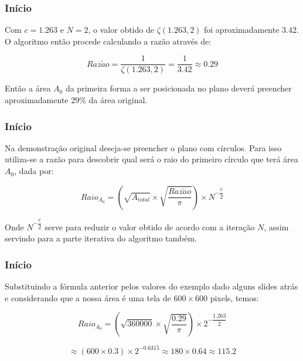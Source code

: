 \documentclass[aspectratio=169]{beamer}
\begin{document}
\begin{frame}
\frametitle{Início}

Com $c=1.263$ e $N=2$, o valor obtido de $\zeta(1.263,2)$ foi aproximadamente $3.42$. O algoritmo então procede calculando a razão através de: 
\medskip

\begin{equation}
Raz\tilde{a}o=\dfrac{1}{\zeta(1.263,2)}=\dfrac{1}{3.42}\approx0.29
\end{equation}
\medskip

Então a área $A_{0}$ da primeira forma a ser posicionada no plano deverá preencher aproximadamente $29\%$ da área original.
\medskip

\end{frame}

\begin{frame}
\frametitle{Início}

Na demonstração original deseja-se preencher o plano com círculos. Para isso utiliza-se a razão para descobrir qual será o raio do primeiro círculo que terá área $A_{0}$, dada por:
\medskip

\begin{equation}
Raio_{A_{0}}= (\sqrt{A_{total}} \times \sqrt{\dfrac{Raz\tilde{a}o}{\pi}}) \times N^{-\dfrac{c}{2}} 
\end{equation}
\medskip

Onde $N^{-\dfrac{c}{2}}$ serve para reduzir o valor obtido de acordo com a iteração $N$, assim servindo para a parte iterativa do algoritmo também.
\medskip

\end{frame}

\begin{frame}
\frametitle{Início}

Substituindo a fórmula anterior pelos valores do exemplo dado alguns slides atrás e considerando que a nossa área é uma tela de $600 \times 600$ pixels, temos:
\medskip

\begin{equation}
Raio_{A_{0}} = (\sqrt{360000} \times \sqrt{\dfrac{0.29}{\pi}}) \times 2^{-\dfrac{1.263}{2}}
\end{equation}

$$
\approx (600 \times 0.3) \times 2^{-0.6315} \approx 180 \times 0.64 \approx 115.2
$$

\end{frame}
\end{document}
